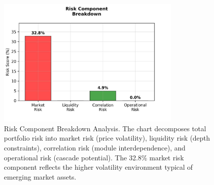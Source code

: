 \documentclass[12pt]{article}
\begin{document}
\begin{figure}[h]
    \centering
    \includegraphics[width=0.8\textwidth]{risk_component_breakdown.jpeg}
    \caption{Risk Component Breakdown Analysis. The chart decomposes total portfolio risk into market risk (price volatility), liquidity risk (depth constraints), correlation risk (module interdependence), and operational risk (cascade potential). The 32.8\% market risk component reflects the higher volatility environment typical of emerging market assets.}
    \label{fig:risk_component_breakdown}
\end{figure}
\end{document}
